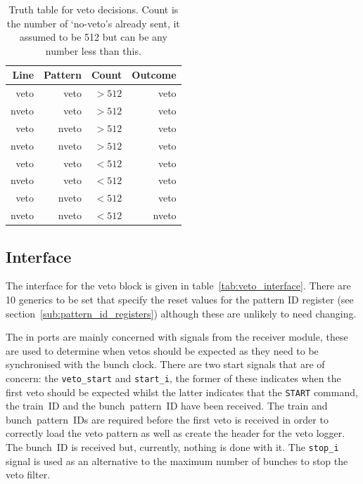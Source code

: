 \begin{table}
  \begin{center}
    \begin{tabular}{r|r|r||r}
      Line  & Pattern &   Count  & Outcome \\
      \hline
      veto  &   veto  & \(>512\) & veto  \\
      nveto &   veto  & \(>512\) & veto  \\
      veto  &  nveto  & \(>512\) & veto  \\
      nveto &  nveto  & \(>512\) & veto  \\
      veto  &   veto  & \(<512\) & veto  \\
      nveto &   veto  & \(<512\) & veto  \\
      veto  &  nveto  & \(<512\) & veto  \\
      nveto &  nveto  & \(<512\) & nveto \\
            
    \end{tabular}
  \end{center}
  \caption{Truth table for veto decisions. Count is the number of `no-veto's already sent, it assumed to be 512 but can be any number less than this.}
  \label{tab:veto_truth_table}
\end{table}
\subsection{Interface} %
\label{sub:veto_interface}
The interface for the veto block is given in table~\ref{tab:veto_interface}. There are 10 generics to be set that specify the reset values for the pattern ID register (see section~\ref{sub:pattern_id_registers}) although these are unlikely to need changing.
    
The in ports are mainly concerned with signals from the receiver module, these are used to determine when vetos should be expected as they need to be synchronised with the bunch clock. There are two start signals that are of concern: the \texttt{veto\_start} and \texttt{start\_i}, the former of these indicates when the first veto should be expected whilst the latter indicates that the \texttt{START} command, the train~ID and the bunch~pattern~ID have been received. The train and bunch~pattern~IDs are required before the first veto is received in order to correctly load the veto pattern as well as create the header for the veto logger. The bunch~ID is received but, currently, nothing is done with it. The \texttt{stop\_i} signal is used as an alternative to the maximum number of bunches to stop the veto filter.
    
